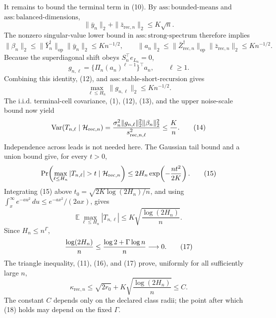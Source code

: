 It remains to bound the terminal term in (10).  By \(\mathrm{ass{:}bounded\mbox{-}means}\) and \(\mathrm{ass{:}balanced\mbox{-}dimensions}\),
\[
 \|\bar y_n\|_2+\|\bar z_{\mathrm{rec},n}\|_2\le K\sqrt n.
\]
The nonzero singular-value lower bound in \(\mathrm{ass{:}strong\mbox{-}spectrum}\) therefore implies
\[
 \|\beta_n\|_2
 \le\|\bar Y_n^\dagger\|_{\mathrm{op}}\|\bar y_n\|_2
 \le K n^{-1/2},
 \qquad
 \|a_n\|_2
 \le\|\bar Z_{\mathrm{rec},n}^\dagger\|_{\mathrm{op}}
       \|\bar z_{\mathrm{rec},n}\|_2
 \le K n^{-1/2}.
 \tag{12}
\]
Because the superdiagonal shift obeys \(S_n^{\top}e_{L_n}=0\),
\[
 g_{n,\ell}
 =\{\Pi_n(a_n)^{\ell-1}\}^{\top}a_n,
 \qquad \ell\ge1.
\]
Combining this identity, (12), and \(\mathrm{ass{:}stable\mbox{-}short\mbox{-}recursion}\) gives
\[
 \max_{\ell\le H_n}\|g_{n,\ell}\|_2\le K n^{-1/2}.
 \tag{13}
\]
The i.i.d. terminal-cell covariance, (1), (12), (13), and the upper noise-scale bound now yield
\[
 \operatorname{Var}(T_{n,\ell}\mid\mathcal H_{\mathrm{rec},n})
 ={\sigma_n^2\|g_{n,\ell}\|_2^2\|\beta_n\|_2^2
   \over s_{\mathrm{rec},n,\ell}^2}
 \le {K\over n}.
 \tag{14}
\]
Independence across leads is not needed here.  The Gaussian tail bound and a union bound give, for every \(t>0\),
\[
 \Pr\!\left(\max_{\ell\le H_n}|T_{n,\ell}|>t
       \mid\mathcal H_{\mathrm{rec},n}\right)
 \le2H_n\exp\!\left(-{nt^2\over2K}\right).
 \tag{15}
\]
Integrating (15) above
\(t_0=\sqrt{2K\log(2H_n)/n}\), and using
\(\int_x^\infty e^{-au^2}\,du\le e^{-ax^2}/(2ax)\), gives
\[
 \mathbb E\max_{\ell\le H_n}|T_{n,\ell}|
 \le K\sqrt{\frac{\log(2H_n)}n}.
 \tag{16}
\]
Since \(H_n\le n^\Gamma\),
\[
 {\log(2H_n)\over n}
 \le {\log2+\Gamma\log n\over n}\longrightarrow0.
 \tag{17}
\]
The triangle inequality, (11), (16), and (17) prove, uniformly for all sufficiently large \(n\),
\[
 \kappa_{\mathrm{rec},n}
 \le\sqrt{2r_0}+K\sqrt{\frac{\log(2H_n)}n}
 \le C.
 \tag{18}
\]
The constant \(C\) depends only on the declared class radii; the point after which (18) holds may depend on the fixed \(\Gamma\).

